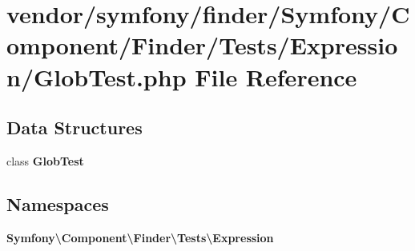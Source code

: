 \section{vendor/symfony/finder/\+Symfony/\+Component/\+Finder/\+Tests/\+Expression/\+Glob\+Test.php File Reference}
\label{_glob_test_8php}
\subsection*{Data Structures}
\begin{DoxyCompactItemize}
\item 
class {\bf Glob\+Test}
\end{DoxyCompactItemize}
\subsection*{Namespaces}
\begin{DoxyCompactItemize}
\item 
 {\bf Symfony\textbackslash{}\+Component\textbackslash{}\+Finder\textbackslash{}\+Tests\textbackslash{}\+Expression}
\end{DoxyCompactItemize}
